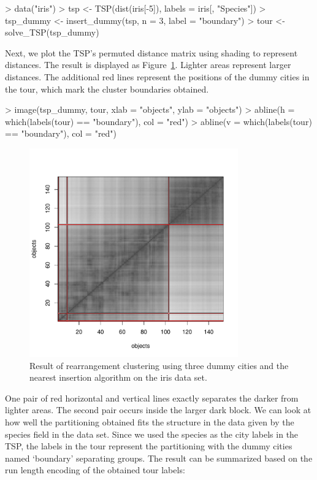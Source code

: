 \documentclass[10pt,a4paper,fleqn]{article}
\begin{document}
\begin{Schunk}
\begin{Sinput}
> data("iris")
> tsp <- TSP(dist(iris[-5]), labels = iris[, "Species"])
> tsp_dummy <- insert_dummy(tsp, n = 3, label = "boundary")
> tour <- solve_TSP(tsp_dummy)
\end{Sinput}
\end{Schunk}

Next, we plot the TSP's permuted distance matrix using shading to
represent distances. The result is displayed as
Figure~\ref{fig:clustering}. Lighter areas represent larger
distances. The additional red lines represent the positions of the dummy
cities in the tour, which mark the cluster boundaries obtained.


\begin{Schunk}
\begin{Sinput}
> image(tsp_dummy, tour, xlab = "objects", ylab = "objects")
> abline(h = which(labels(tour) == "boundary"), col = "red")
> abline(v = which(labels(tour) == "boundary"), col = "red")
\end{Sinput}
\end{Schunk}


\begin{figure}
\centering
\includegraphics[width=9cm, height=9cm, trim=0 20 0 0]{TSP-clustering}
\caption{Result of rearrangement clustering using three dummy cities and the 
nearest insertion algorithm on the iris data set.}
\label{fig:clustering}
\end{figure}


One pair of red horizontal and vertical lines exactly separates the
darker from lighter areas.  The second pair occurs inside the larger
dark block.  We can look at how well the partitioning obtained fits the
structure in the data given by the species field in the data set.  Since
we used the species as the city labels in the TSP, the labels in the
tour represent the partitioning with the dummy cities named `boundary'
separating groups.  The result can be summarized based on the run length
encoding of the obtained tour labels:
\end{document}
